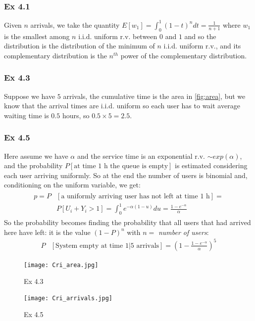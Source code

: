 	\subsubsection*{Ex 4.1}
	Given $n$ arrivals, we take the quantity $E[w_1] = \int_{0}^{1}(1-t)^n dt = \frac{1}{n+1}$ where $w_1$ is the smallest among $n$ i.i.d. uniform r.v. between $0$ and $1$ and so the distribution is the distribution of the minimum of $n$ i.i.d. uniform r.v., and its complementary distribution is the $n^{th}$ power of the complementary distribution.\\
	\subsubsection*{Ex 4.3}
	Suppose we have $5$ arrivals, the cumulative time is the area in \autoref{fig:area}, but we know that the arrival times are i.i.d. uniform so each user has to wait average waiting time is $0.5$ hours, so $0.5\times5 = 2.5$.\\
	\subsubsection*{Ex 4.5}
	Here assume we have $\alpha$  and the service time is an exponential r.v. $\sim exp(\alpha)$, and the probability $P[\text{at time 1 h the queue is empty}]$ is estimated considering each user arriving uniformly. So at the end the number of users is binomial and, conditioning on the uniform variable, we get:
	\begin{align}
	\begin{split}
	p = P & [\text{a uniformly arriving user has not left at time 1 h}] =\\
	& P[U_i + Y_i > 1] = \int_{0}^{1}e^{-\alpha(1-u)}du = \frac{1-e^{-\alpha}}{\alpha}
	\end{split}
	\end{align}
	So the probability becomes finding the probability that all users that had arrived here have left: it is the value $(1-P)^{n}$ with $n = $ \textit{number of users}:
	\begin{align}
	P&[\text{System empty at time 1|5 arrivals}] = (1-\frac{1-e^{-\alpha}}{\alpha})^5
	\end{align}
	\begin{figure}[h]
	\begin{minipage}[c]{0.5\textwidth}
	\texttt{[image: Cri\_area.jpg]}
	\caption{Ex 4.3}
	\end{minipage}
	\hspace{10mm}
	\label{fig:area}
	\begin{minipage}[c]{0.5\textwidth}
	\texttt{[image: Cri\_arrivals.jpg]}
	\caption{Ex 4.5}
	\end{minipage}
	\end{figure}

